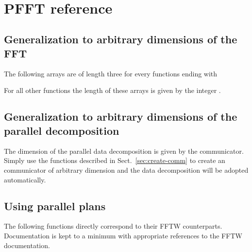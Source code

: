 \chapter{PFFT reference}\label{chap:ref}

\section{Generalization to arbitrary dimensions of the FFT}
The following arrays are of length three for every functions ending with 
\begin{compactitem}
  \item {}
  \item {}
  \item {}
\end{compactitem}
For all other functions the length of these arrays is given by the integer .

\section{Generalization to arbitrary dimensions of the parallel decomposition}
The dimension of the parallel data decomposition is given by the communicator.
Simply use the functions described in Sect.~\ref{sec:create-comm} to create an communicator of arbitrary dimension
and the data decomposition will be adopted automatically.



\section{Using parallel plans}
The following functions directly correspond to their FFTW counterparts. Documentation is kept to a minimum with appropriate references to the FFTW documentation.

